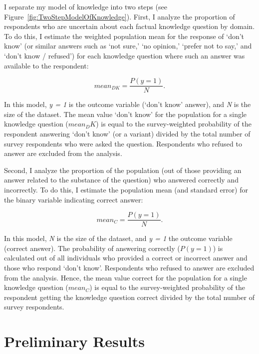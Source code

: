 \documentclass[11pt]{article}
\begin{document}
I separate my model of knowledge into two steps (see
Figure~\ref{fig:TwoStepModelOfKnowledge}). First, I analyze the proportion of
respondents who are uncertain about each factual knowledge
question by domain. To do this, I estimate the weighted population mean for the
response of `don't know' (or similar answers such as `not sure,' `no opinion,'
`prefer not to say,' and `don't know / refused') for each knowledge question
where such an answer was available to the respondent:

 $$ mean_{DK} = \frac{P(y = 1)}{N}. $$

In this model, \emph{y = 1} is the outcome variable (`don't know' answer), and
\emph{N} is the size of the dataset. The mean value `don't know' for the population for a single knowledge
question ($mean_DK$) is equal to the survey-weighted probability of the
respondent answering `don't know' (or a variant) divided by the total number of
survey respondents who were asked the question. Respondents who refused to answer are excluded from the analysis.

Second, I analyze the proportion of the population (out of those providing an answer related to the substance of the
question) who answered correctly and incorrectly. To do this, I estimate the
population mean (and standard error) for the binary variable indicating correct
answer:

 $$ mean_C = \frac{P(y = 1)}{N}. $$

In this model, \emph{N} is the size of the dataset, and \emph{y = 1} the outcome
variable (correct answer). The probability of answering correctly ($P(y = 1)$)
is calculated out of all individuals who provided a correct or incorrect answer and those who respond
`don't know'. Respondents who refused to answer are excluded from the analysis.
Hence, the mean value correct for the population for a single knowledge
question ($mean_C$) is equal to the survey-weighted probability of the
respondent getting the knowledge question correct divided by the total number of
survey respondents.


\hypertarget{results}{%
\section{Preliminary Results}\label{sec:results}}
\end{document}
